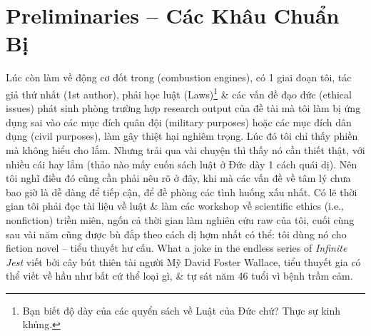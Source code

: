 \documentclass[12pt,twoside]{book}
\begin{document}
\chapter{Preliminaries -- Các Khâu Chuẩn Bị}
\minitoc
Lúc còn làm về động cơ đốt trong (combustion engines), có 1 giai đoạn tôi, tác giả thứ nhất (1st author), phải học luật (Laws)\footnote{Bạn biết độ dày của các quyển sách về Luật của Đức chứ? Thực sự kinh khủng.} \& các vấn đề đạo đức (ethical issues) phát sinh phòng trường hợp research output của đề tài mà tôi làm bị ứng dụng sai vào các mục đích quân đội (military purposes) hoặc các mục đích dân dụng (civil purposes), làm gây thiệt hại nghiêm trọng. Lúc đó tôi chỉ thấy phiền mà không hiểu cho lắm. Nhưng trải qua vài chuyện thì thấy nó cần thiết thật, với nhiều cái hay lắm (thảo nào mấy cuốn sách luật ở Đức dày 1 cách quái dị). Nên tôi nghĩ điều đó cũng cần phải nêu rõ ở đây, khi mà các vấn đề về tâm lý chưa bao giờ là dễ dàng để tiếp cận, để đề phòng các tình huống xấu nhất. Có lẽ thời gian tôi phải đọc tài liệu về luật \& làm các workshop về scientific ethics (i.e., nonfiction) triền miên, ngốn cả thời gian làm nghiên cứu raw của tôi, cuối cùng sau vài năm cũng được bù đắp theo cách dị hợm nhất có thể: tôi dùng nó cho fiction novel -- tiểu thuyết hư cấu. What a joke in the endless series of {\it Infinite Jest} \cite{Wallace_jest} viết bởi cây bút thiên tài người Mỹ {\sc David Foster Wallace}, tiểu thuyết gia có thể viết về hầu như bất cứ thể loại gì, \& tự sát năm 46 tuổi vì bệnh trầm cảm.
\end{document}
